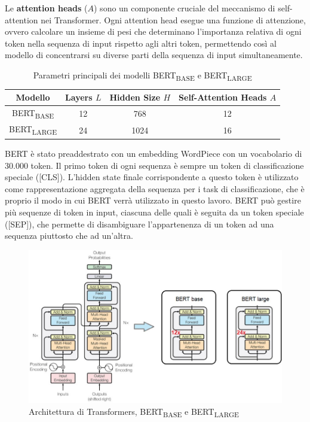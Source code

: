 \documentclass[../../Thesis.tex]{subfiles}
\begin{document}
Le \textbf{attention heads} ($A$) sono un componente cruciale del meccanismo di self-attention nei Transformer. Ogni attention head esegue una funzione di attenzione, ovvero calcolare un insieme di pesi che determinano l'importanza relativa di ogni token nella sequenza di input rispetto agli altri token, permettendo così al modello di concentrarsi su diverse parti della sequenza di input simultaneamente. 

\begin{table}[h]
    \centering
    \begin{tabular}{|c|c|c|c|}
        \hline
        Modello & Layers $L$ & Hidden Size $H$ & Self-Attention Heads $A$ \\
        \hline
        BERT\textsubscript{BASE} & 12 & 768 & 12 \\
        \hline
        BERT\textsubscript{LARGE} & 24 & 1024 & 16 \\
        \hline
    \end{tabular}
    \caption{Parametri principali dei modelli BERT\textsubscript{BASE} e BERT\textsubscript{LARGE}}
    \label{tab:bert_params}
\end{table}

BERT è stato preaddestrato con un embedding WordPiece \cite{WordPiece} con un vocabolario di 30.000 token. Il primo token di ogni sequenza è sempre un token di classificazione speciale ([CLS]). L'hidden state finale corrispondente a questo token è utilizzato come rappresentazione aggregata della sequenza per i task di classificazione, che è proprio il modo in cui BERT verrà utilizzato in questo lavoro. BERT può gestire più sequenze di token in input, ciascuna delle quali è seguita da un token speciale ([SEP]), che permette di disambiguare l'appartenenza di un token ad una sequenza piuttosto che ad un'altra. 

\begin{figure}[H]
    \centering
    \includegraphics[width=\textwidth]{../../img/bert_base_large.jpg}
    \caption{Architettura di Transformers, BERT\textsubscript{BASE} e BERT\textsubscript{LARGE}}
    \label{fig:bert_input}
\end{figure}
\end{document}
